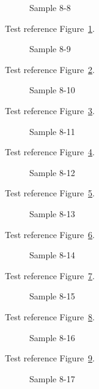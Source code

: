 \begin{figure}[tbhp]
\caption{Sample 8-8}
\label{fig:sample-8-8}
\end{figure}

Test reference Figure~\ref{fig:sample-8-8}.

\begin{figure}[tbhp]
\caption{Sample 8-9}
\label{fig:sample-8-9}
\end{figure}

Test reference Figure~\ref{fig:sample-8-9}.

\begin{figure}[tbhp]
\caption{Sample 8-10}
\label{fig:sample-8-10}
\end{figure}

Test reference Figure~\ref{fig:sample-8-10}.

\begin{figure}[tbhp]
\caption{Sample 8-11}
\label{fig:sample-8-11}
\end{figure}

Test reference Figure~\ref{fig:sample-8-11}.

\begin{figure}[tbhp]
\caption{Sample 8-12}
\label{fig:sample-8-12}
\end{figure}

Test reference Figure~\ref{fig:sample-8-12}.

\begin{figure}[tbhp]
\caption{Sample 8-13}
\label{fig:sample-8-13}
\end{figure}

Test reference Figure~\ref{fig:sample-8-13}.

\begin{figure}[tbhp]
\caption{Sample 8-14}
\label{fig:sample-8-14}
\end{figure}

Test reference Figure~\ref{fig:sample-8-14}.

\begin{figure}[tbhp]
\caption{Sample 8-15}
\label{fig:sample-8-15}
\end{figure}

Test reference Figure~\ref{fig:sample-8-15}.

\begin{figure}[tbhp]
\caption{Sample 8-16}
\label{fig:sample-8-16}
\end{figure}

Test reference Figure~\ref{fig:sample-8-16}.

\begin{figure}[tbhp]
\caption{Sample 8-17}
\label{fig:sample-8-17}
\end{figure}

